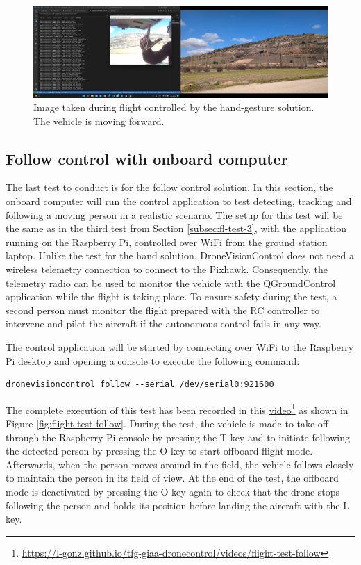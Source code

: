 \begin{figure}[H]
  \centering
  \includegraphics[width=\textwidth, keepaspectratio]{img/video-field-test-hand.png}
  \caption{Image taken during flight controlled by the hand-gesture solution. The vehicle is moving forward.}
  \label{fig:flight-test-hand}
\end{figure}


\subsection{Follow control with onboard computer}
\label{subsec:fl-test-5}

The last test to conduct is for the follow control solution. In this section, the onboard computer will run the control application to test detecting, tracking and following a moving person in a realistic scenario. The setup for this test will be the same as in the third test from Section \ref{subsec:fl-test-3}, with the application running on the Raspberry Pi, controlled over WiFi from the ground station laptop. Unlike the test for the hand solution, DroneVisionControl does not need a wireless telemetry connection to connect to the Pixhawk. Consequently, the telemetry radio can be used to monitor the vehicle with the QGroundControl application while the flight is taking place. To ensure safety during the test, a second person must monitor the flight prepared with the RC controller to intervene and pilot the aircraft if the autonomous control fails in any way.


The control application will be started by connecting over WiFi to the Raspberry Pi desktop and opening a console to execute the following command:
\begin{verbatim}
dronevisioncontrol follow --serial /dev/serial0:921600
\end{verbatim}


The complete execution of this test has been recorded in this \href{https://l-gonz.github.io/tfg-giaa-dronecontrol/videos/flight-test-follow}{video}\footnote{\url{https://l-gonz.github.io/tfg-giaa-dronecontrol/videos/flight-test-follow}} as shown in Figure \ref{fig:flight-test-follow}. During the test, the vehicle is made to take off through the Raspberry Pi console by pressing the T key and to initiate following the detected person by pressing the O key to start offboard flight mode. Afterwards, when the person moves around in the field, the vehicle follows closely to maintain the person in its field of view. At the end of the test, the offboard mode is deactivated by pressing the O key again to check that the drone stops following the person and holds its position before landing the aircraft with the L key.

